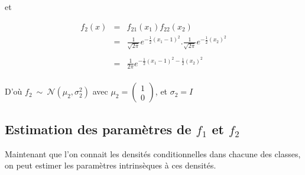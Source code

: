 \documentclass[a4paper,11pt]{article}
\begin{document}
\noindent et

\begin{center}
   $$ 
   \begin{array}{rcl}
   f_2(x)   &=&  f_{21} (x_1) f_{22} (x_2) \\ 
   	   &=& \displaystyle  \frac{1}{\sqrt{2 \pi}} e^{-\frac{1}{2} (x_1 -1)^2}.  \frac{1}{\sqrt{2 \pi}} e^{-\frac{1}{2} (x_2)^2}\\ \\
	   &=& \displaystyle \frac{1}{2 \pi}    e^{-\frac{1}{2} (x_1 -1)^2 - \frac{1}{2} (x_2)^2} \\
	       \end{array}
   $$
\end{center}

\noindent D'où $f_2  \  \sim \ \mathcal{N}( \mu_2, \sigma_2^2)$ avec $\mu_2 =  \left (
   \begin{array}{ccc}
      1 \\
      0
   \end{array}
   \right )$, et $\sigma_2 = I$ \\
   
\subsection{Estimation des paramètres de $f_1$ et $f_2$}

\noindent Maintenant que l'on connait les densités conditionnelles dans chacune des classes, on peut estimer les paramètres intrinsèques à ces densités.
\end{document}
